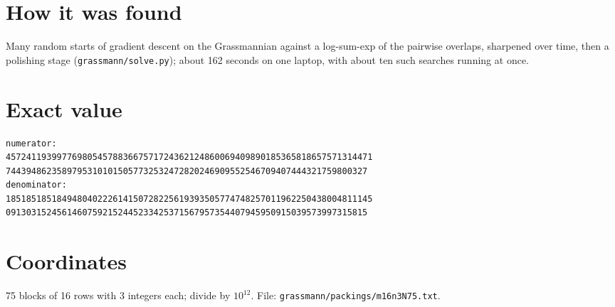 \documentclass[11pt,a4paper]{article}
\begin{document}
\section{How it was found}
Many random starts of gradient descent on the Grassmannian against a log-sum-exp of the pairwise overlaps, sharpened over time, then a polishing stage (\texttt{grassmann/solve.py}); about 162 seconds on one laptop, with about ten such searches running at once.


\appendix
\section{Exact value}
{\small
\begin{verbatim}
numerator:
457241193997769805457883667571724362124860069409890185365818657571314471
74439486235897953101015057732532472820246909552546709407444321759800327
denominator:
185185185184948040222614150728225619393505774748257011962250438004811145
09130315245614607592152445233425371567957354407945950915039573997315815
\end{verbatim}}

\section{Coordinates}
75 blocks of 16 rows with 3 integers each; divide by $10^{12}$. File: \texttt{grassmann/packings/m16n3N75.txt}.
{\tiny
\begin{multicols}{3}
\end{multicols}}
\end{document}
